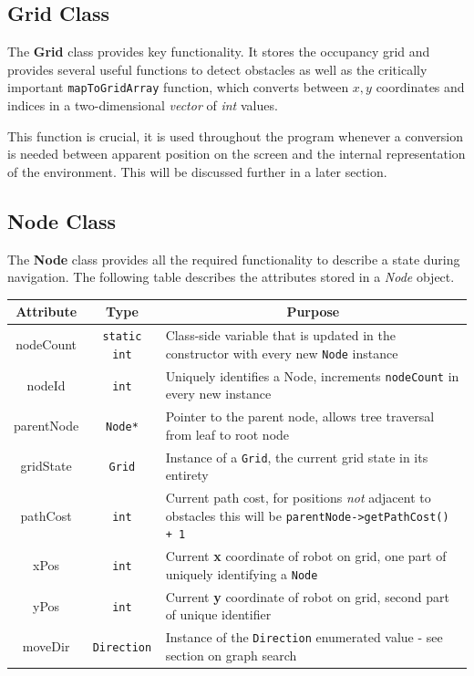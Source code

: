 \documentclass[a4paper,12pt]{article}
\begin{document}
\subsection{Grid Class}
The \textbf{Grid} class provides key functionality. It stores the occupancy grid and provides several useful functions to detect obstacles as well as the critically important \texttt{mapToGridArray} function, which converts between $x,y$ coordinates and indices in a two-dimensional \textit{vector} of \textit{int} values. 

This function is crucial, it is used throughout the program whenever a conversion is needed between apparent position on the screen and the internal representation of the environment. This will be discussed further in a later section.
\subsection{Node Class}
The \textbf{Node} class provides all the required functionality to describe a state during navigation. The following table describes the attributes stored in a \textit{Node} object.
\begin{table}[h!]
\scriptsize
\begin{tabular}{|c|c|l|}
    \hline
    \multicolumn{1}{|c|}{\textbf{Attribute}} & \multicolumn{1}{c|}{\textbf{Type}} & \multicolumn{1}{c|}{\textbf{Purpose}} \\
    \hline
    nodeCount & \texttt{static int} & Class-side variable that is updated in the constructor with every new \texttt{Node} instance\\
    \hline
    nodeId & \texttt{int} & Uniquely identifies a Node, increments \texttt{nodeCount} in every new instance\\
    \hline
    parentNode & \texttt{Node*} & Pointer to the parent node, allows tree traversal from leaf to root node \\
    \hline
    gridState & \texttt{Grid} & Instance of a \texttt{Grid},  the current grid state in its entirety\\
    \hline
    pathCost & \texttt{int} & Current path cost, for positions \textit{not} adjacent to obstacles this will be \texttt{parentNode->getPathCost() + 1} \\
    \hline
    xPos & \texttt{int} & Current \textbf{x} coordinate of robot on grid, one part of uniquely identifying a \texttt{Node} \\
    \hline
    yPos & \texttt{int} & Current \textbf{y} coordinate of robot on grid, second part of unique identifier\\
    \hline
    moveDir & \texttt{Direction} & Instance of the \texttt{Direction} enumerated value - see section on graph search \\
    \hline
\end{tabular}
\normalsize
\end{table}
\end{document}
